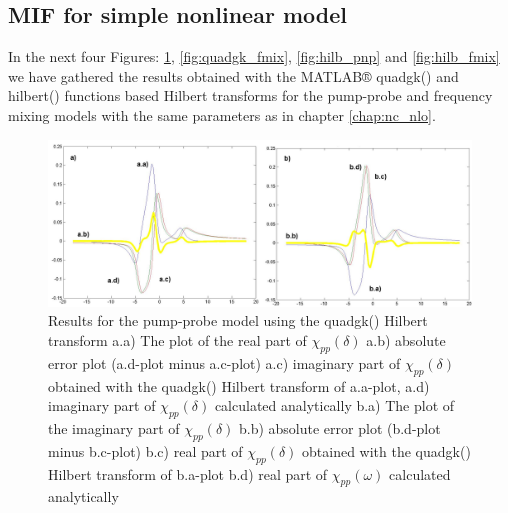 \documentclass[12pt,twoside,a4paper]{article}
\numberwithin{equation}{subsection}
\numberwithin{figure}{subsection}
\begin{document}
\subsection{MIF for simple nonlinear model} \label{chap:matlab_nlo}

In the next four Figures: \ref{fig:quadgk_pnp}, \ref{fig:quadgk_fmix}, \ref{fig:hilb_pnp} and \ref{fig:hilb_fmix} we have gathered
the results obtained with the MATLAB® quadgk() and hilbert() functions based Hilbert transforms for the pump-probe and frequency
mixing models with the same parameters as in chapter \ref{chap:nc_nlo}. 

\begin{figure} 
  \includegraphics[width=150mm]{img/quadgk_pnp.png}
  \caption{Results for the pump-probe model using the quadgk() Hilbert transform
     a.a) The plot of the real part of ${\chi_{pp}}(\delta )$
     a.b) absolute error plot (a.d-plot minus a.c-plot)
     a.c) imaginary part of ${\chi_{pp}}(\delta )$ obtained with the quadgk() Hilbert transform of a.a-plot, 
     a.d) imaginary part of ${\chi_{pp}}(\delta )$ calculated analytically 
     b.a) The plot of the imaginary part of ${\chi_{pp}}(\delta )$ 
     b.b) absolute error plot (b.d-plot minus b.c-plot)
     b.c) real part of ${\chi_{pp}}(\delta )$ obtained with the quadgk() Hilbert transform of b.a-plot 
     b.d) real part of $\chi_{pp} (\omega )$ calculated analytically 
     \label{fig:quadgk_pnp}
     }
\end{figure}
\end{document}
